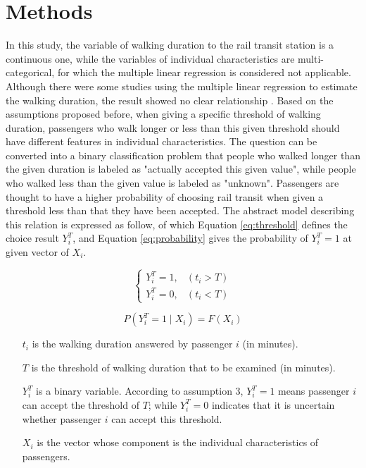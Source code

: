 \documentclass[sustainability,article,submit,moreauthors,pdftex,10pt,a4paper]{Definitions/mdpi}
\begin{document}
\section{Methods}
%
In this study, the variable of walking duration to the rail transit station is a continuous one, while the variables of individual characteristics are multi-categorical, for which the multiple linear regression is considered not applicable. Although there were some studies using the multiple linear regression to estimate the walking duration, the result showed no clear relationship \cite{krygsman2004multimodal}. Based on the assumptions proposed before, when giving a specific threshold of walking duration, passengers who walk longer or less than this given threshold should have different features in individual characteristics. The question can be converted into a binary classification problem that people who walked longer than the given duration is labeled as "actually accepted this given value", while people who walked less than the given value is labeled as "unknown". Passengers are thought to have a higher probability of choosing rail transit when given a threshold less than that they have been accepted. The abstract model describing this relation is expressed as follow, of which Equation \ref{eq:threshold} defines the choice result $Y^T_i$, and Equation \ref{eq:probability} gives the probability of $Y^T_i=1$ at given vector of $X_i$.

\begin{equation}
\left\{\begin{matrix}
Y^T_i=1,&(t_i>T) \\
Y^T_i=0,&(t_i<T)
\end{matrix}\right.
\label{eq:threshold}
\end{equation}

\begin{equation}
P(Y^T_i=1 \mid X_i)=F(X_i)
\label{eq:probability}
\end{equation}

%
\begin{enumerate}
	\item[$t_i$] is the walking duration answered by passenger $i$ (in minutes).
	\item[$T$] is the threshold of walking duration that to be examined (in minutes).
	\item[$Y^T_i$] is a binary variable. According to assumption 3, $Y^T_i=1$ means passenger $i$ can accept the threshold of $T$; while $Y^T_i=0$ indicates that it is uncertain whether passenger $i$ can accept this threshold.
	\item[$X_i$] is the vector whose component is the individual characteristics of passengers.
\end{enumerate}
\end{document}

